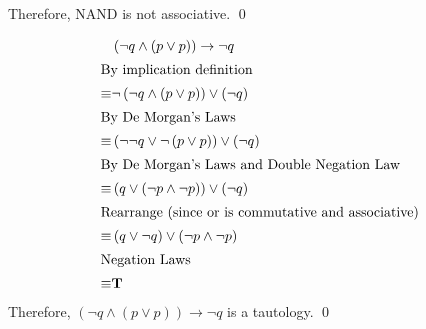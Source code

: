 \documentclass[letterpaper, 12pt]{article}
\begin{document}
Therefore, NAND is not associative. \qed

\newpage
    \begin{align*}
                    & \left(\lnot q \land \left(p \lor p\right)\right) \rightarrow \lnot q \\
        \shortintertext{By implication definition} 
            \equiv  & \lnot\left(\lnot q \land \left(p \lor p\right)\right) \lor \left(\lnot q\right) \\
        \shortintertext{By De Morgan's Laws}
            \equiv  & \left(\lnot\lnot q \lor \lnot\left( p \lor p\right)\right) \lor \left(\lnot q\right)\\
        \shortintertext{By De Morgan's Laws and Double Negation Law}
            \equiv  & \left( q \lor \left(\lnot p \land \lnot p\right)\right) \lor \left(\lnot q \right)\\
        \shortintertext{Rearrange (since or is commutative and associative)}
            \equiv  & \left( q \lor \lnot q\right) \lor \left(\lnot p\land \lnot p\right)\\
        \shortintertext{Negation Laws}
            \equiv  & \mathbf{T}
    \end{align*}
    Therefore, $\left(\lnot q \land \left(p \lor p\right)\right) \rightarrow \lnot q$ is a tautology. \qed
    
\end{document}
